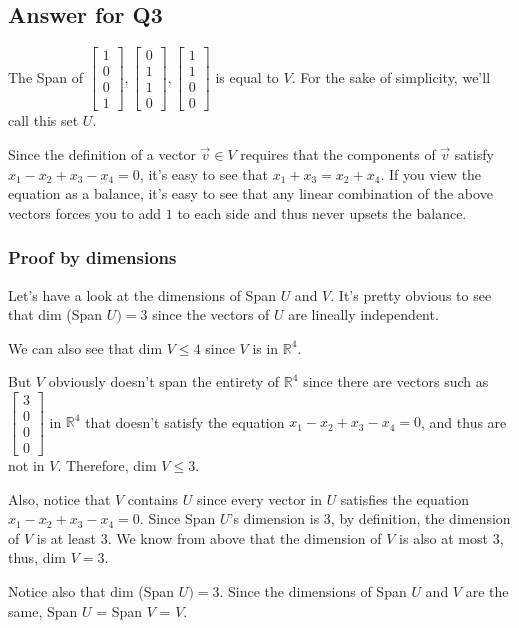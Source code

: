 \documentclass[letter]{article}
\newcommand{\R}{\mathbb{R}}
\newcommand{\mat}[1]{\begin{bmatrix}#1\end{bmatrix}}
\begin{document}
\subsection{Answer for Q3}
The Span of $\mat{1\\0\\0\\1}, \mat{0\\1\\1\\0}, \mat{1\\1\\0\\0}$ is equal to $V$. For the sake of simplicity, we'll call this set $U$.

Since the definition of a vector $\vec v \in V$ requires that the components of $\vec v$ satisfy $x_1-x_2+x_3-x_4=0$, it's easy to see that $x_1+x_3 = x_2+x_4$. If you view the equation as a balance, it's easy to see that any linear combination of the above vectors forces you to add $1$ to each side and thus never upsets the balance.

\subsubsection{Proof by dimensions}

Let's have a look at the dimensions of Span $U$ and $V$.
It's pretty obvious to see that dim (Span $U) = 3$ since the vectors of $U$ are lineally independent.

We can also see that dim $V \leq 4$ since $V$ is in $\R^4$.

But $V$ obviously doesn't span the entirety of $\R^4$ since there are vectors such as $\mat{3\\0\\0\\0}$ in $\R^4$ that doesn't satisfy the equation $x_1-x_2+x_3-x_4=0$, and thus are not in $V$. Therefore, dim $V \leq 3$.

Also, notice that $V$ contains $U$ since every vector in $U$ satisfies the equation $x_1-x_2+x_3-x_4=0$. Since Span $U$'s dimension is 3, by definition, the dimension of $V$ is at least $3$. We know from above that the dimension of $V$ is also at most $3$, thus, dim $V=3$.

Notice also that dim (Span $U)=3$. Since the dimensions of Span $U$ and $V$ are the same, Span $U$ = Span $V$ = $V$.
\end{document}
